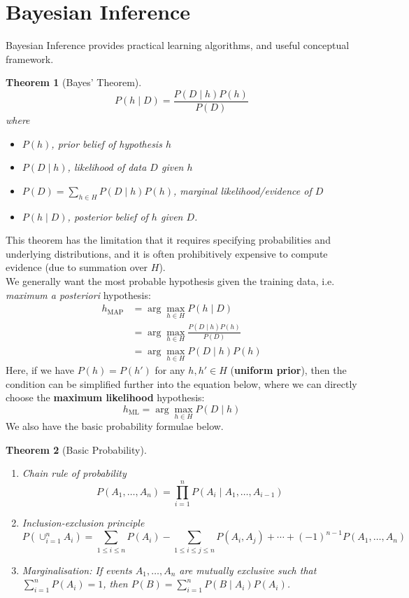 \documentclass[12pt]{article}
\newtheorem{theorem}{Theorem}[section]
\theoremstyle{definition}
\begin{document}
\section{Bayesian Inference}
Bayesian Inference provides practical learning algorithms, and useful conceptual framework.
\begin{theorem}[Bayes' Theorem]
\hfill\\\normalfont 
\[
P(h\mid D) = \frac{P(D\mid h)P(h)}{P(D)}
\]
where
\begin{itemize}
	\item $P(h)$, prior belief of hypothesis $h$
	\item $P(D\mid h)$, likelihood of data $D$ given $h$
	\item $P(D)=\sum_{h\in H}P(D\mid h)P(h)$, marginal likelihood/evidence of $D$
	\item $P(h\mid D)$, posterior belief of $h$ given $D$.
\end{itemize}
\end{theorem}
This theorem has the limitation that it requires specifying probabilities and underlying distributions, and it is often prohibitively expensive to compute evidence (due to summation over $H$).\\
We generally want the most probable hypothesis given the training data, i.e. \textit{maximum a posteriori} hypothesis:
\begin{align*}
h_{\text{MAP}}&=\arg\max_{h\in H} P(h\mid D)\\
&=\arg\max_{h\in H} \frac{P(D\mid h)P(h)}{P(D)}\\
&=\arg\max_{h\in H}P(D\mid h)P(h) 
\end{align*}
Here, if we have $P(h)=P(h')$ for any $h, h'\in H$ (\textbf{uniform prior}), then the condition can be simplified further into the equation below, where we can directly choose the \textbf{maximum likelihood} hypothesis:
\[
h_{\text{ML}}=\arg\max_{h\in H}P(D\mid h)
\]
We also have the basic probability formulae below.
\begin{theorem}[Basic Probability]
\hfill\\\normalfont \begin{enumerate}
\item Chain rule of probability
\[
P(A_1,\ldots, A_n)=\prod_{i=1}^n P(A_i\mid A_1,\ldots, A_{i-1})
\]
\item Inclusion-exclusion principle
\[
P(\cup_{i=1}^n A_i)=\sum_{1\leq i\leq n}P(A_i)-\sum_{1\leq i\leq j\leq n}P(A_i,A_j)+\cdots+(-1)^{n-1}P(A_1, \ldots, A_n)
\]
\item Marginalisation: If events $A_1,\ldots, A_n$ are mutually exclusive such that $\sum_{i=1}^n P(A_i)=1$, then $P(B)=\sum_{i=1}^n P(B\mid A_i)P(A_i)$.
\end{enumerate}
\end{theorem}
\end{document}
